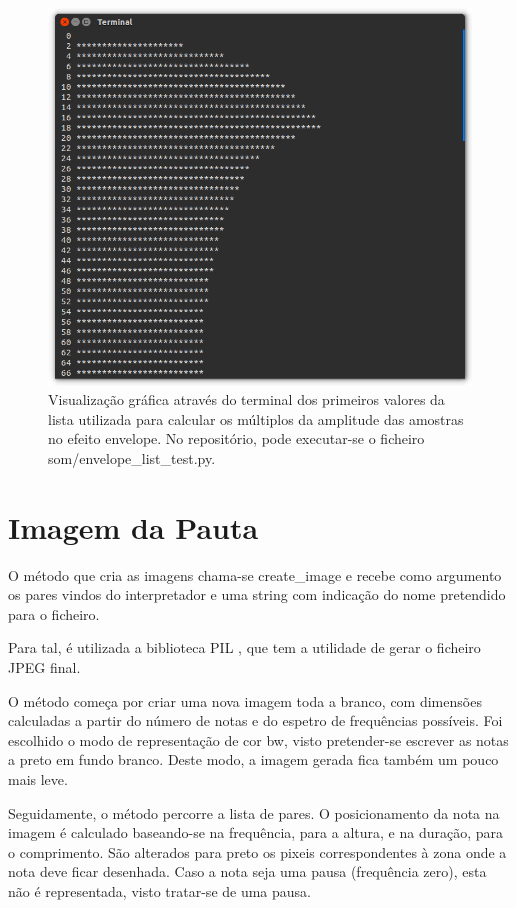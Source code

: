 \begin{figure}[htp]
\centering
\includegraphics[width=\textwidth]{images/envelopelist.png}
\caption{Visualização gráfica através do terminal dos primeiros valores da lista utilizada para calcular os múltiplos da amplitude das amostras no efeito envelope. No repositório, pode executar-se o ficheiro som/envelope\_list\_test.py.}
\label{envelopelist}
\end{figure}

\section{Imagem da Pauta}
O método que cria as imagens chama-se create\_image e recebe como argumento os pares vindos do interpretador e uma string com indicação do nome pretendido para o ficheiro.

Para tal, é utilizada a biblioteca PIL \cite{pil}, que tem a utilidade de gerar o ficheiro JPEG final.

O método começa por criar uma nova imagem toda a branco, com dimensões calculadas a partir do número de notas e do espetro de frequências possíveis. Foi escolhido o modo de representação de cor \ac{bw}, visto pretender-se escrever as notas a preto em fundo branco. Deste modo, a imagem gerada fica também um pouco mais leve.

Seguidamente, o método percorre a lista de pares. O posicionamento da nota na imagem é calculado baseando-se na frequência, para a altura, e na duração, para o comprimento. São alterados para preto os pixeis correspondentes à zona onde a nota deve ficar desenhada. Caso a nota seja uma pausa (frequência zero), esta não é representada, visto tratar-se de uma pausa.


